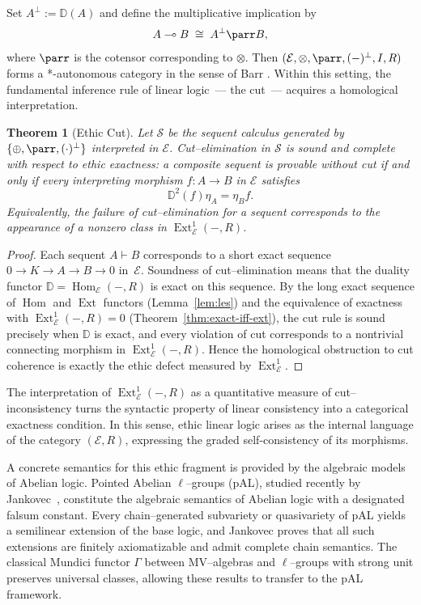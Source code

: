 \documentclass[12pt]{article}
\newcommand{\E}{\mathcal{E}}
\newcommand{\Hom}{\operatorname{Hom}}
\newcommand{\Ext}{\operatorname{Ext}}
\theoremstyle{plain}
\newtheorem{theorem}{Theorem}[section]
\theoremstyle{definition}
\theoremstyle{remark}
\numberwithin{equation}{section}
\begin{document}
Set $A^\perp:=\mathbb D(A)$ and define the multiplicative implication by
\[
A\multimap B \;\cong\; A^\perp\parr B,
\]
where $\parr$ is the cotensor corresponding to $\otimes$.  Then $(\E,\otimes,\parr,(-)^\perp,I,R)$ forms a *-autonomous category in the sense of Barr \cite{Barr1979}.  Within this setting, the fundamental inference rule of linear logic~--- the cut~--- acquires a homological interpretation.

\begin{theorem}[Ethic Cut]
Let $\mathcal S$ be the sequent calculus generated by $\{\oplus,\parr,(\cdot)^\perp\}$ interpreted in $\E$.  
Cut--elimination in $\mathcal S$ is sound and complete with respect to ethic exactness: a composite sequent is provable without cut if and only if every interpreting morphism $f:A\to B$ in $\E$ satisfies
\[
\mathbb D^2(f)\eta_A=\eta_B f.
\]
Equivalently, the failure of cut--elimination for a sequent corresponds to the appearance of a nonzero class in $\Ext^1_\E(-,R)$.
\end{theorem}

\begin{proof}
Each sequent $A\vdash B$ corresponds to a short exact sequence $0\to K\to A\to B\to0$ in~$\E$.  
Soundness of cut--elimination means that the duality functor $\mathbb D=\Hom_\E(-,R)$ is exact on this sequence.  
By the long exact sequence of $\Hom$ and $\Ext$ functors (Lemma~\ref{lem:les}) and the equivalence of exactness with $\Ext^1_\E(-,R)=0$ (Theorem~\ref{thm:exact-iff-ext}), the cut rule is sound precisely when $\mathbb D$ is exact, and every violation of cut corresponds to a nontrivial connecting morphism in $\Ext^1_\E(-,R)$.  
Hence the homological obstruction to cut coherence is exactly the ethic defect measured by $\Ext^1_\E$.
\end{proof}

The interpretation of $\Ext^1_\E(-,R)$ as a quantitative measure of cut--inconsistency turns the syntactic property of linear consistency into a categorical exactness condition.  In this sense, ethic linear logic arises as the internal language of the category $(\E,R)$, expressing the graded self-consistency of its morphisms.

A concrete semantics for this ethic fragment is provided by the algebraic models of Abelian logic.  Pointed Abelian $\ell$--groups (pAL), studied recently by Jankovec~\cite{Jankovec2025}, constitute the algebraic semantics of Abelian logic with a designated falsum constant.  Every chain--generated subvariety or quasivariety of pAL yields a semilinear extension of the base logic, and Jankovec proves that all such extensions are finitely axiomatizable and admit complete chain semantics.  
The classical Mundici functor $\Gamma$ between MV--algebras and $\ell$--groups with strong unit preserves universal classes, allowing these results to transfer to the pAL framework.
\end{document}
